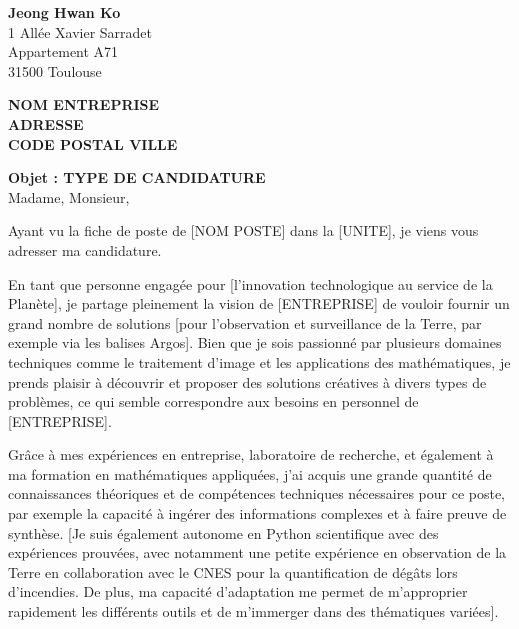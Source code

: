 \documentclass[11pt, a4paper, sans]{article}
\begin{document}
\thispagestyle{empty}
{\raggedright
\textbf{Jeong Hwan Ko}\\1 Allée Xavier Sarradet\\ Appartement A71\\31500 Toulouse}

{\raggedleft
\textbf{NOM ENTREPRISE\\ ADRESSE\\ CODE POSTAL VILLE\\}
\vspace{5mm}
\raggedright
\textbf{Objet : TYPE DE CANDIDATURE\\}
\vspace{5mm}
\justifying
Madame, Monsieur,

Ayant vu la fiche de poste de [NOM POSTE] dans la [UNITE], je viens vous adresser ma candidature.

En tant que personne engagée pour [l'innovation technologique au service de la Planète], je partage pleinement la vision de [ENTREPRISE] de vouloir fournir un grand nombre de solutions [pour l'observation et surveillance de la Terre, par exemple via les balises Argos]. Bien que je sois passionné par plusieurs domaines techniques comme le traitement d'image et les applications des mathématiques, je prends plaisir à  découvrir et proposer des solutions créatives à divers types de problèmes, ce qui semble correspondre aux besoins en personnel de [ENTREPRISE].


Grâce à mes expériences en entreprise, laboratoire de recherche, et également à ma formation en mathématiques appliquées, j'ai acquis une grande quantité de connaissances théoriques et de compétences techniques nécessaires pour ce poste, par exemple la capacité à ingérer des informations complexes et à faire preuve de synthèse. [Je suis également autonome en Python scientifique avec des expériences prouvées, avec notamment une petite expérience en observation de la Terre en collaboration avec le CNES pour la quantification de dégâts lors d'incendies. De plus, ma capacité d'adaptation me permet de m'approprier rapidement les différents outils et de m'immerger dans des thématiques variées].

}
\end{document}
